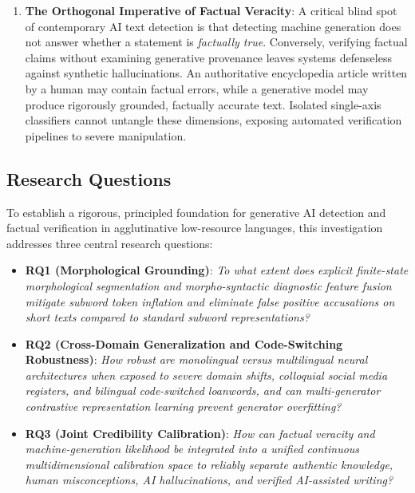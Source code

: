 \begin{enumerate}
    \item \textbf{The Orthogonal Imperative of Factual Veracity}: A critical blind spot of contemporary AI text detection is that detecting machine generation does not answer whether a statement is \textit{factually true}. Conversely, verifying factual claims without examining generative provenance leaves systems defenseless against synthetic hallucinations. An authoritative encyclopedia article written by a human may contain factual errors, while a generative model may produce rigorously grounded, factually accurate text. Isolated single-axis classifiers cannot untangle these dimensions, exposing automated verification pipelines to severe manipulation.
\end{enumerate}

\subsection{Research Questions}
To establish a rigorous, principled foundation for generative AI detection and factual verification in agglutinative low-resource languages, this investigation addresses three central research questions:
\begin{itemize}
    \item \textbf{RQ1 (Morphological Grounding)}: \textit{To what extent does explicit finite-state morphological segmentation and morpho-syntactic diagnostic feature fusion mitigate subword token inflation and eliminate false positive accusations on short texts compared to standard subword representations?}
    \item \textbf{RQ2 (Cross-Domain Generalization and Code-Switching Robustness)}: \textit{How robust are monolingual versus multilingual neural architectures when exposed to severe domain shifts, colloquial social media registers, and bilingual code-switched loanwords, and can multi-generator contrastive representation learning prevent generator overfitting?}
    \item \textbf{RQ3 (Joint Credibility Calibration)}: \textit{How can factual veracity and machine-generation likelihood be integrated into a unified continuous multidimensional calibration space to reliably separate authentic knowledge, human misconceptions, AI hallucinations, and verified AI-assisted writing?}
\end{itemize}


